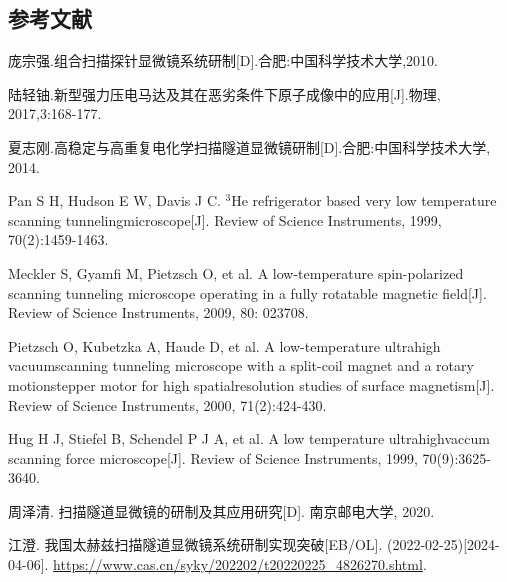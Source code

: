 \documentclass{article}
\begin{document}
\begin{spacing}{1.625}
	
	
\newpage
{}
\section*{参考文献} %
\renewcommand{\section}[2]{}
%
	\begin{thebibliography}{25}
		 庞宗强.组合扫描探针显微镜系统研制[D].合肥:中国科学技术大学,2010.
		
		 陆轻铀.新型强力压电马达及其在恶劣条件下原子成像中的应用[J].物理, 2017,3:168-177.
		
		 夏志刚.高稳定与高重复电化学扫描隧道显微镜研制[D].合肥:中国科学技术大学, 2014.
		
		 Pan S H, Hudson E W, Davis J C. $^\text{3}$He refrigerator based very low temperature scanning tunnelingmicroscope[J]. Review of Science Instruments, 1999, 70(2):1459-1463.
		
		 Meckler S, Gyamfi M, Pietzsch O, et al. A low-temperature spin-polarized scanning tunneling microscope operating in a fully rotatable magnetic field[J]. Review of Science Instruments, 2009, 80: 023708.
		
		 Pietzsch O, Kubetzka A, Haude D, et al. A low-temperature ultrahigh vacuumscanning tunneling microscope with a split-coil magnet and a rotary motionstepper motor for high spatialresolution studies of surface magnetism[J]. Review of Science Instruments, 2000, 71(2):424-430.
		
		Hug H J, Stiefel B, Schendel P J A, et al. A low temperature ultrahighvaccum scanning force microscope[J]. Review of Science Instruments, 1999, 70(9):3625-3640.
		
		 周泽清. 扫描隧道显微镜的研制及其应用研究[D]. 南京邮电大学, 2020.
		
		 江澄. 我国太赫兹扫描隧道显微镜系统研制实现突破[EB/OL]. (2022-02-25)[2024-04-06]. \href{https://www.cas.cn/syky/202202/t20220225\_4826270.shtml}{https://www.cas.cn/syky/202202/t20220225\_4826270.shtml}.
		

\end{thebibliography}
\end{spacing}
\end{document}
